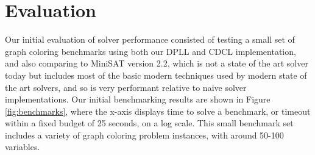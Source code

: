 \documentclass[12pt]{article}
\begin{document}




\section{Evaluation}

Our initial evaluation of solver performance consisted of testing a small set of graph coloring benchmarks using both our DPLL and CDCL implementation, and also comparing to MiniSAT version 2.2, which is not a state of the art solver today but includes most of the basic modern techniques used by modern state of the art solvers, and so is very performant relative to naive solver implementations. Our initial benchmarking results are shown in Figure \ref{fig:benchmarks}, where the x-axis displays time to solve a benchmark, or timeout within a fixed budget of 25 seconds, on a log scale. This small benchmark set includes a variety of graph coloring problem instances, with around 50-100 variables.
\end{document}
